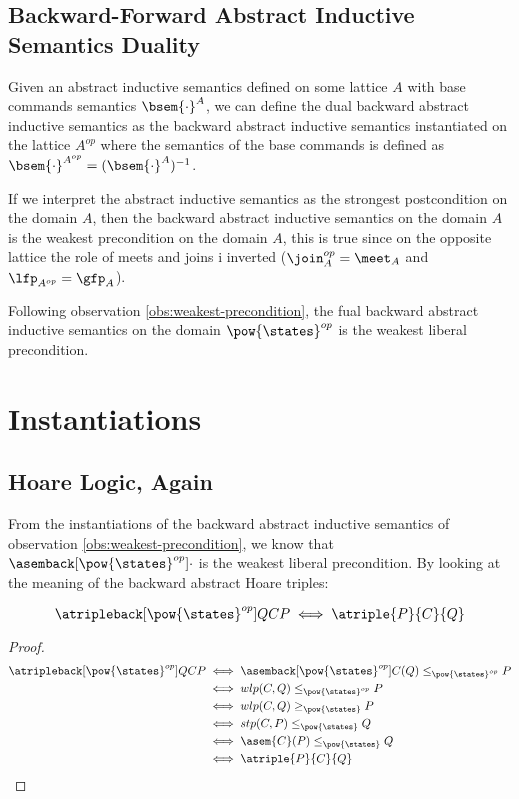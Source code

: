 \subsection{Backward-Forward Abstract Inductive Semantics Duality}

\begin{definition}
  Given an abstract inductive semantics defined on some lattice $A$ with
  base commands semantics $\bsem{\cdot}^A$, we can define the dual backward 
  abstract inductive semantics as the backward abstract inductive semantics
  instantiated on the lattice $A^{op}$ where the semantics of the
  base commands is defined as $\bsem{\cdot}^{A^{op}} = (\bsem{\cdot}^A)^{-1}$.
\end{definition}

If we interpret the abstract inductive semantics as the strongest postcondition
on the domain $A$, then the backward abstract inductive semantics on the domain 
$A$ is the weakest precondition on the domain $A$, this is true since on the 
opposite lattice the role of meets and joins i inverted ($\join_A^{op} = 
\meet_A$ and $\lfp_{A^{op}} = \gfp_A$).

\begin{observation}
  \label{obs:weakest-precondition}
  Following observation \ref{obs:weakest-precondition}, the fual backward 
  abstract inductive semantics on the domain $\pow{\states}^{op}$ is the weakest 
  liberal precondition.
\end{observation}

\section{Instantiations}

\subsection{Hoare Logic, Again}

From the instantiations of the backward abstract inductive semantics of 
observation \ref{obs:weakest-precondition}, we know that 
$\asemback[\pow{\states}^{op}]{\cdot}$ is the weakest liberal precondition. By 
looking at the meaning of the backward abstract Hoare triples:

\begin{theorem}
  $$\atripleback[\pow{\states}^{op}]{Q}{C}{P} \iff \atriple{P}{C}{Q}$$
\end{theorem}
\begin{proof}
\begin{align*}
  \atripleback[\pow{\states}^{op}]{Q}{C}{P}
    &\iff \asemback[\pow{\states}^{op}]{C}(Q) \leq_{\pow{\states}^{op}} P \\
    &\iff wlp(C, Q) \leq_{\pow{\states}^{op}} P \\
    &\iff wlp(C, Q) \geq_{\pow{\states}} P \\
    &\iff stp(C, P) \leq_{\pow{\states}} Q \\
    &\iff \asem{C}(P) \leq_{\pow{\states}} Q \\
    &\iff \atriple{P}{C}{Q}
\end{align*}
\end{proof}

